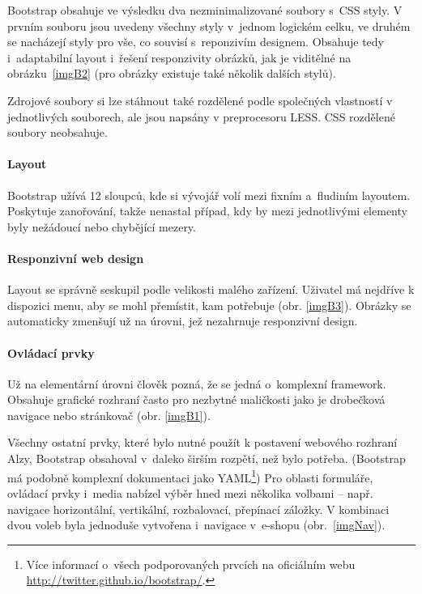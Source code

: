 \documentclass[thesis=B,czech]{FITthesis}[2012/06/26]
\begin{document}
Bootstrap obsahuje ve výsledku dva nezminimalizované soubory s~\gls{CSS} styly. V prvním souboru jsou uvedeny všechny styly v~jednom logickém celku, ve druhém se nacházejí styly pro vše, co souvisí s~reponzivím designem. Obsahuje tedy i~adaptabilní layout i~řešení responzivity obrázků, jak je viditělné na obrázku~\ref{imgB2} (pro obrázky existuje také několik dalších stylů).

Zdrojové soubory si lze stáhnout také rozdělené podle společných vlastností v jednotlivých souborech, ale jsou napsány v preprocesoru LESS. \gls{CSS} rozdělené soubory neobsahuje.


\paragraph{Layout}

Bootstrap užívá 12 sloupců, kde si vývojář volí mezi fixním a~fludiním layoutem. Poskytuje zanořování, takže nenastal případ, kdy by mezi jednotlivými elementy byly nežádoucí nebo chybějící mezery. 

\paragraph{Responzivní web design}

Layout se správně seskupil podle velikosti malého zařízení. Uživatel má nejdříve k dispozici menu, aby se mohl přemístit, kam potřebuje (obr. \ref{imgB3}). Obrázky se automaticky zmenšují už na úrovni, jež nezahrnuje responzivní design.



\paragraph{Ovládací prvky}

Už na elementární úrovni člověk pozná, že se jedná o~komplexní framework. Obsahuje grafické rozhraní často pro nezbytné maličkosti jako je drobečková navigace nebo stránkovač (obr. \ref{imgB1}).

Všechny ostatní prvky, které bylo nutné použít k postavení webového rozhraní Alzy, Bootstrap obsahoval v~daleko širším rozpětí, než bylo potřeba. (Bootstrap má podobně komplexní dokumentaci jako \gls{YAML}\footnote{Více informací o~všech podporovaných prvcích na oficiálním webu \\ \url{http://twitter.github.io/bootstrap/}.}) Pro oblasti formuláře, ovládací prvky i~media nabízel výběr hned mezi několika volbami -- např. navigace horizontální, vertikální, rozbalovací, přepínací záložky. V kombinaci dvou voleb byla jednoduše vytvořena i~navigace v~e-shopu (obr.~\ref{imgNav}).
\end{document}
